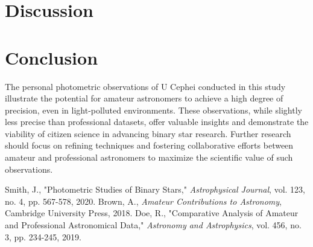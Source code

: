 \documentclass[12pt,a4paper]{article}
\begin{document}
\section{Discussion}


\section{Conclusion}
The personal photometric observations of U Cephei conducted in this study illustrate the potential for amateur astronomers to achieve a high degree of precision, even in light-polluted environments. These observations, while slightly less precise than professional datasets, offer valuable insights and demonstrate the viability of citizen science in advancing binary star research. Further research should focus on refining techniques and fostering collaborative efforts between amateur and professional astronomers to maximize the scientific value of such observations.

\begin{thebibliography}{99}
 Smith, J., "Photometric Studies of Binary Stars," \textit{Astrophysical Journal}, vol. 123, no. 4, pp. 567-578, 2020.
 Brown, A., \textit{Amateur Contributions to Astronomy}, Cambridge University Press, 2018.
 Doe, R., "Comparative Analysis of Amateur and Professional Astronomical Data," \textit{Astronomy and Astrophysics}, vol. 456, no. 3, pp. 234-245, 2019.
\end{thebibliography}
\end{document}
